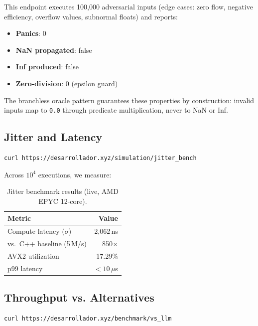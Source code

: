 \documentclass[10pt,twocolumn]{article}
\begin{document}
This endpoint executes 100{,}000 adversarial inputs (edge cases: zero flow, negative
efficiency, overflow values, subnormal floats) and reports:

\begin{itemize}
\item \textbf{Panics}: 0
\item \textbf{NaN propagated}: false
\item \textbf{Inf produced}: false
\item \textbf{Zero-division}: 0 (epsilon guard)
\end{itemize}

The branchless oracle pattern guarantees these properties by construction: invalid inputs
map to \texttt{0.0} through predicate multiplication, never to NaN or Inf.

\subsection{Jitter and Latency}

\begin{lstlisting}[language=bash]
curl https://desarrollador.xyz/simulation/jitter_bench
\end{lstlisting}

Across $10^4$ executions, we measure:

\begin{table}[h]
\centering
\small
\begin{tabular}{lr}
\toprule
Metric & Value \\
\midrule
Compute latency ($\sigma$) & 2{,}062\,ns \\
vs.\ C++ baseline (5\,M/s) & 850$\times$ \\
AVX2 utilization & 17.29\% \\
p99 latency & $< 10\,\mu$s \\
\bottomrule
\end{tabular}
\caption{Jitter benchmark results (live, AMD EPYC 12-core).}
\label{tab:jitter}
\end{table}

\subsection{Throughput vs. Alternatives}

\begin{lstlisting}[language=bash]
curl https://desarrollador.xyz/benchmark/vs_llm
\end{lstlisting}
\end{document}
